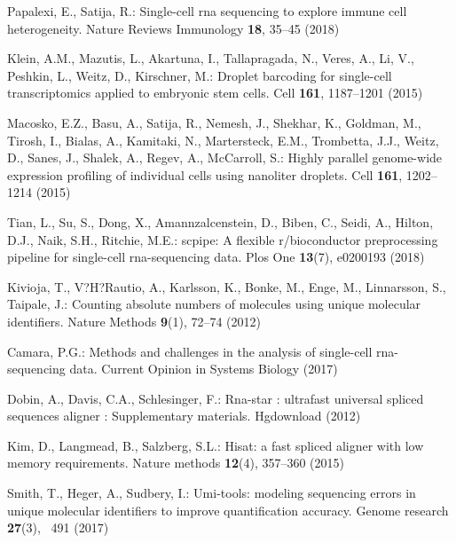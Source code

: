 \documentclass[runningheads]{llncs}
\begin{document}
\begin{thebibliography}{8}

%
%

Papalexi, E., Satija, R.: Single-cell rna sequencing to explore immune cell
heterogeneity. Nature Reviews Immunology  \textbf{18},  35--45 (2018)

Klein, A.M., Mazutis, L., Akartuna, I., Tallapragada, N., Veres, A., Li, V.,
Peshkin, L., Weitz, D., Kirschner, M.: Droplet barcoding for single-cell
transcriptomics applied to embryonic stem cells. Cell  \textbf{161},
1187--1201 (2015)
  
Macosko, E.Z., Basu, A., Satija, R., Nemesh, J., Shekhar, K., Goldman, M.,
Tirosh, I., Bialas, A., Kamitaki, N., Martersteck, E.M., Trombetta, J.J.,
Weitz, D., Sanes, J., Shalek, A., Regev, A., McCarroll, S.: Highly parallel
genome-wide expression profiling of individual cells using nanoliter
droplets. Cell  \textbf{161},  1202--1214 (2015)

Tian, L., Su, S., Dong, X., Amannzalcenstein, D., Biben, C., Seidi, A., Hilton,
D.J., Naik, S.H., Ritchie, M.E.: scpipe: A flexible r/bioconductor
preprocessing pipeline for single-cell rna-sequencing data. Plos One
\textbf{13}(7),  e0200193 (2018)

Kivioja, T., V?H?Rautio, A., Karlsson, K., Bonke, M., Enge, M., Linnarsson, S.,
Taipale, J.: Counting absolute numbers of molecules using unique molecular
identifiers. Nature Methods  \textbf{9}(1),  72--74 (2012)

Camara, P.G.: Methods and challenges in the analysis of single-cell
rna-sequencing data. Current Opinion in Systems Biology  (2017)

Dobin, A., Davis, C.A., Schlesinger, F.: Rna-star : ultrafast universal spliced
sequences aligner : Supplementary materials. Hgdownload  (2012)

Kim, D., Langmead, B., Salzberg, S.L.: Hisat: a fast spliced aligner with low
memory requirements. Nature methods  \textbf{12}(4),  357--360 (2015)

Smith, T., Heger, A., Sudbery, I.: Umi-tools: modeling sequencing errors in
unique molecular identifiers to improve quantification accuracy. Genome
research  \textbf{27}(3), ~491 (2017)


\end{thebibliography}
\end{document}
